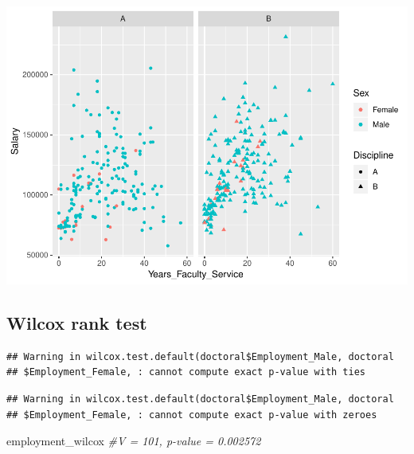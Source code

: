 \documentclass[]{article}
\newenvironment{Shaded}{\begin{snugshade}}{\end{snugshade}}
\newcommand{\KeywordTok}[1]{\textcolor[rgb]{0.13,0.29,0.53}{\textbf{#1}}}
\newcommand{\DataTypeTok}[1]{\textcolor[rgb]{0.13,0.29,0.53}{#1}}
\newcommand{\StringTok}[1]{\textcolor[rgb]{0.31,0.60,0.02}{#1}}
\newcommand{\CommentTok}[1]{\textcolor[rgb]{0.56,0.35,0.01}{\textit{#1}}}
\newcommand{\OtherTok}[1]{\textcolor[rgb]{0.56,0.35,0.01}{#1}}
\newcommand{\OperatorTok}[1]{\textcolor[rgb]{0.81,0.36,0.00}{\textbf{#1}}}
\newcommand{\NormalTok}[1]{#1}
\begin{document}
\includegraphics{Assignment_5_Markdown_files/figure-latex/unnamed-chunk-11-1.pdf}

\subsection{Wilcox rank test}\label{wilcox-rank-test}

\begin{Shaded}
\end{Shaded}

\begin{verbatim}
## Warning in wilcox.test.default(doctoral$Employment_Male, doctoral
## $Employment_Female, : cannot compute exact p-value with ties
\end{verbatim}

\begin{verbatim}
## Warning in wilcox.test.default(doctoral$Employment_Male, doctoral
## $Employment_Female, : cannot compute exact p-value with zeroes
\end{verbatim}

\begin{Shaded}
\begin{Highlighting}[]
\NormalTok{employment_wilcox }\CommentTok{#V = 101, p-value = 0.002572}
\end{Highlighting}
\end{Shaded}
\end{document}
